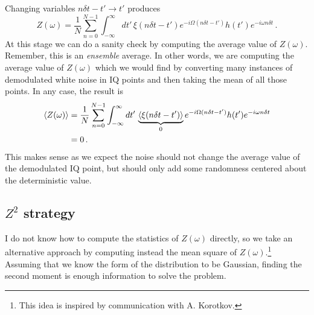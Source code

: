 Changing variables $n \delta t - t' \rightarrow t'$ produces
\begin{equation}
Z(\omega) = \frac{1}{N} \sum_{n=0}^{N-1} \int_{-\infty}^\infty dt' \, \xi(n \delta t - t') e^{-i \Omega (n \delta t - t')} h(t') e^{-i \omega n \delta t}  \, .
\end{equation}
At this stage we can do a sanity check by computing the average value of $Z(\omega)$.
Remember, this is an \emph{ensemble} average.
In other words, we are computing the average value of $Z(\omega)$ which we would find by converting many instances of demodulated white noise in IQ points and then taking the mean of all those points.
In any case, the result is
\begin{align}
\left\langle Z(\omega) \right\rangle
&= \frac{1}{N} \sum_{n=0}^{N-1} \int_{-\infty}^\infty dt' \, \underbrace{\left\langle \xi(n \delta t - t') \right\rangle}_0 e^{-i \Omega (n \delta t - t')} h(t') e^{-i \omega n \delta t} \\
&= 0 \, .
\end{align}
This makes sense as we expect the noise should not change the average value of the demodulated IQ point, but should only add some randomness centered about the deterministic value.

\subsection{$Z^2$ strategy}

I do not know how to compute the statistics of $Z(\omega)$ directly, so we take an alternative approach by computing instead the mean square of $Z(\omega)$.\footnote{This idea is inspired by communication with A. Korotkov.}
Assuming that we know the form of the distribution to be Gaussian, finding the second moment is enough information to solve the problem.

